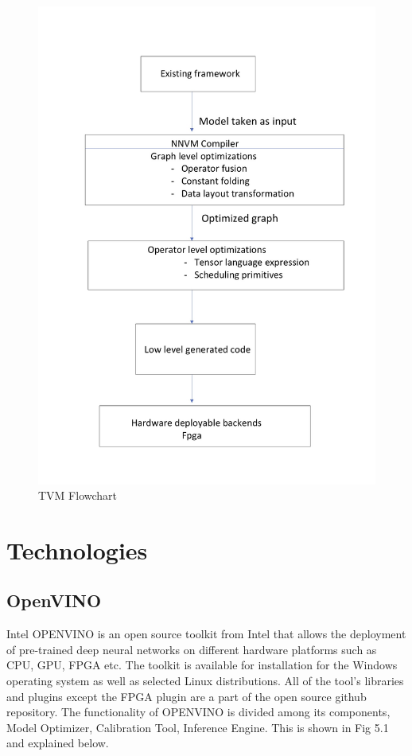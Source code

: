 \documentclass[titlepage]{report}
\begin{document}
\begin{itemize}
\begin{figure}[h!]
    \centering
    \includegraphics[scale=0.15]{TVM_Flowchart.jpg}
    \caption{TVM Flowchart}
\end{figure}


\chapter{Technologies}

\section{OpenVINO}
Intel OPENVINO is an open source toolkit from Intel that allows the deployment of pre-trained deep neural networks on different hardware platforms such as CPU, GPU, FPGA etc. The toolkit is available for installation for the Windows operating system as well as selected Linux distributions. All of the tool's libraries and plugins except the FPGA plugin are a part of the open source github repository.
The functionality of OPENVINO is divided among its components, Model Optimizer, Calibration Tool,  Inference Engine. This is shown in Fig 5.1 and explained below. 


\end{itemize}
\end{document}
